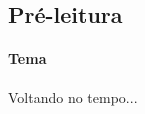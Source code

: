 \documentclass[12pt]{extarticle}
\begin{document}






\subsection{Pré-leitura}


\paragraph{Tema} Voltando no tempo...
\end{document}
